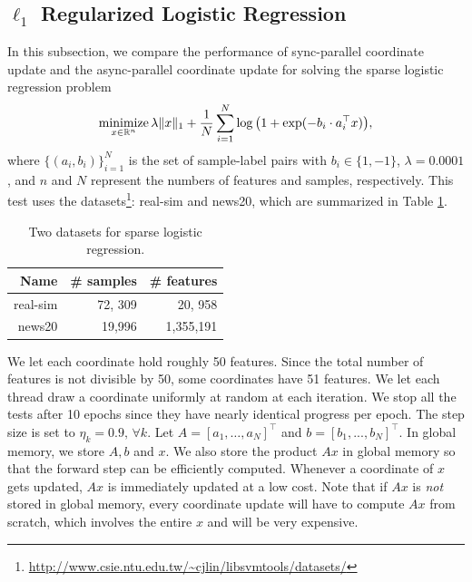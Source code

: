 \subsection{$\ell_1$ Regularized Logistic Regression}
In this subsection, we compare the performance of sync-parallel coordinate update and the async-parallel coordinate update for solving the sparse logistic regression problem 
\begin{equation}\label{eqn:log}
\Min_{x \in \mathbb{R}^n} \lambda \|x\|_1 + \frac{1}{N} \sum_{i=1}^N \log\big(1 + \exp(-b_i \cdot a_i^{\top} x)\big),
\end{equation}
where $\{(a_i, b_i)\}_{i=1}^N$ is the set of sample-label pairs with $b_i \in \{1, -1\}$, $\lambda=0.0001$, and $n$ and $N$ represent the numbers of features and samples, respectively. This test uses the datasets\footnote{\url{http://www.csie.ntu.edu.tw/~cjlin/libsvmtools/datasets/}}: real-sim and news20, which are summarized in Table \ref{tab:log_data}.

\begin{table}[htbp]
\centering
 \begin{tabular}{rrr}
\hline
  Name & \# samples & \# features \\
  \hline
 real-sim & 72, 309 & 20, 958 \\
  news20 & 19,996 & 1,355,191\\
  \hline
 \end{tabular}
  \caption{\label{tab:log_data}Two  datasets for  sparse logistic regression.}
\end{table}

We let each coordinate hold roughly 50 features. {Since the total number of features is not divisible by 50, some coordinates have 51 features.} We let each thread draw a coordinate uniformly at random at each iteration. We stop all the tests after 10 epochs since they have nearly identical progress per epoch. %
The step size is set to $\eta_k=0.9,\,\forall k$. Let $A = [a_1, \ldots, a_N]^{\top}$ and $b = [b_1, ..., b_N]^{\top}$. In global memory, we store $A, b$ and $x$. We also store the product $Ax$ in global memory so that the forward step can be efficiently computed. Whenever a coordinate of $x$ gets updated, $Ax$ is immediately updated at a low cost. Note that if $Ax$ is \emph{not} stored in global memory, every coordinate update will have to compute $Ax$ from scratch, which involves the entire $x$ and will be very expensive.  %

